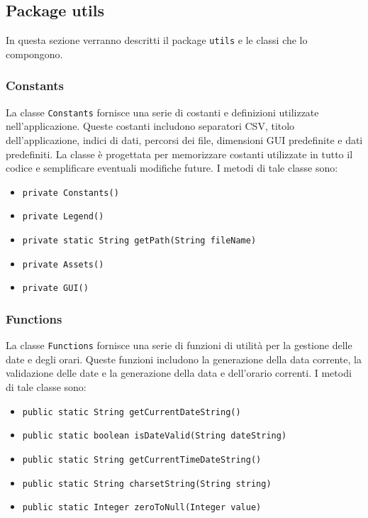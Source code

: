 \subsection{Package utils} 
In questa sezione verranno descritti il package \texttt{utils} e le classi che lo compongono.\\

\subsubsection{Constants}
La classe \texttt{Constants} fornisce una serie di costanti e definizioni utilizzate nell'applicazione.
Queste costanti includono separatori CSV, titolo dell'applicazione, indici di dati, percorsi dei file, dimensioni GUI predefinite e dati predefiniti.
La classe è progettata per memorizzare costanti utilizzate in tutto il codice e semplificare eventuali modifiche future.
I metodi di tale classe sono:
\begin{itemize}
\item \texttt{private Constants()}
\item \texttt{private Legend()}
\item \texttt{private static String getPath(String fileName)}
\item \texttt{private Assets()}
\item \texttt{private GUI()}
\end{itemize}

\subsubsection{Functions}
La classe \texttt{Functions} fornisce una serie di funzioni di utilità per la gestione delle date e degli orari.
Queste funzioni includono la generazione della data corrente, la validazione delle date e la generazione della data e dell'orario correnti.
I metodi di tale classe sono:
\begin{itemize}
\item \texttt{public static String getCurrentDateString()}
\item \texttt{public static boolean isDateValid(String dateString)}
\item \texttt{public static String getCurrentTimeDateString()}
\item \texttt{public static String charsetString(String string)}
\item \texttt{public static Integer zeroToNull(Integer value)}
\end{itemize}

